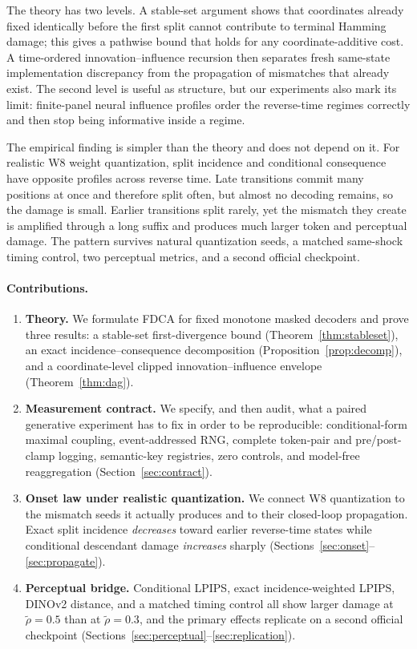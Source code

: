 \documentclass[11pt,a4paper]{article}
\theoremstyle{plain}
\theoremstyle{definition}
\theoremstyle{remark}
\newcommand{\rholabel}{\widetilde{\rho}}
\begin{document}
The theory has two levels. A stable-set argument shows that coordinates already
fixed identically before the first split cannot contribute to terminal Hamming
damage; this gives a pathwise bound that holds for any coordinate-additive cost.
A time-ordered innovation--influence recursion then separates fresh same-state
implementation discrepancy from the propagation of mismatches that already exist.
The second level is useful as structure, but our experiments also mark its limit:
finite-panel neural influence profiles order the reverse-time regimes correctly
and then stop being informative inside a regime.

The empirical finding is simpler than the theory and does not depend on it. For
realistic W8 weight quantization, split incidence and conditional consequence
have opposite profiles across reverse time. Late transitions commit many
positions at once and therefore split often, but almost no decoding remains, so
the damage is small. Earlier transitions split rarely, yet the mismatch they
create is amplified through a long suffix and produces much larger token and
perceptual damage. The pattern survives natural quantization seeds, a matched
same-shock timing control, two perceptual metrics, and a second official
checkpoint.

\paragraph{Contributions.}
\begin{enumerate}[leftmargin=1.6em,itemsep=2pt]
\item \textbf{Theory.} We formulate FDCA for fixed monotone masked decoders and
prove three results: a stable-set first-divergence bound
(Theorem~\ref{thm:stableset}), an exact incidence--consequence decomposition
(Proposition~\ref{prop:decomp}), and a coordinate-level clipped
innovation--influence envelope (Theorem~\ref{thm:dag}).
\item \textbf{Measurement contract.} We specify, and then audit, what a paired
generative experiment has to fix in order to be reproducible: conditional-form
maximal coupling, event-addressed RNG, complete token-pair and pre/post-clamp
logging, semantic-key registries, zero controls, and model-free reaggregation
(Section~\ref{sec:contract}).
\item \textbf{Onset law under realistic quantization.} We connect W8 quantization
to the mismatch seeds it actually produces and to their closed-loop propagation.
Exact split incidence \emph{decreases} toward earlier reverse-time states while
conditional descendant damage \emph{increases} sharply
(Sections~\ref{sec:onset}--\ref{sec:propagate}).
\item \textbf{Perceptual bridge.} Conditional LPIPS, exact incidence-weighted
LPIPS, DINOv2 distance, and a matched timing control all show larger damage at
$\rholabel=0.5$ than at $\rholabel=0.3$, and the primary effects replicate on a second
official checkpoint (Sections~\ref{sec:perceptual}--\ref{sec:replication}).
\end{enumerate}
\end{document}
